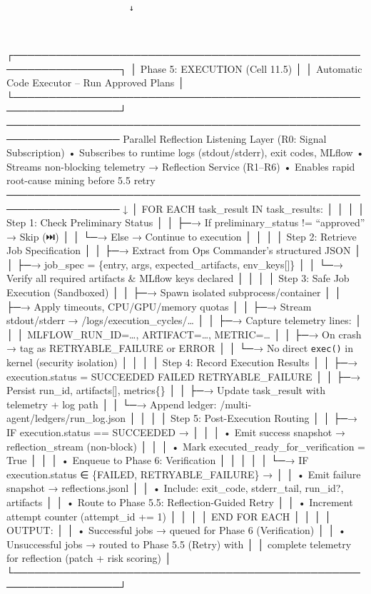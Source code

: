 \documentclass[
]{article}
\begin{document}
\begin{verbatim}
                        ↓
                        
                        
\end{verbatim}

┌─────────────────────────────────────────────────────────────────┐ │
Phase 5: EXECUTION (Cell 11.5) │ │ Automatic Code Executor -- Run
Approved Plans │
└─────────────────────────────────────────────────────────────────┘
──────────────────────────────────────────────────────────────────
Parallel Reflection Listening Layer (R0: Signal Subscription) •
Subscribes to runtime logs (stdout/stderr), exit codes, MLflow • Streams
non-blocking telemetry → Reflection Service (R1--R6) • Enables rapid
root-cause mining before 5.5 retry
────────────────────────────────────────────────────────────────── ↓ │
FOR EACH task\_result IN task\_results: │ │ │ │ Step 1: Check
Preliminary Status │ │ ├─→ If preliminary\_status != ``approved'' → Skip
(⏭️) │ │ └─→ Else → Continue to execution │ │ │ │ Step 2: Retrieve Job
Specification │ │ ├─→ Extract from Ops Commander's structured JSON │ │
├─→ job\_spec = \{entry, args, expected\_artifacts, env\_keys{[}{]}\} │
│ └─→ Verify all required artifacts \& MLflow keys declared │ │ │ │ Step
3: Safe Job Execution (Sandboxed) │ │ ├─→ Spawn isolated
subprocess/container │ │ ├─→ Apply timeouts, CPU/GPU/memory quotas │ │
├─→ Stream stdout/stderr → /logs/execution\_cycles/\ldots{} │ │ ├─→
Capture telemetry lines: │ │ │ MLFLOW\_RUN\_ID=\ldots, ARTIFACT=\ldots,
METRIC=\ldots{} │ │ ├─→ On crash → tag as RETRYABLE\_FAILURE or ERROR │
│ └─→ No direct \texttt{exec()} in kernel (security isolation) │ │ │ │
Step 4: Record Execution Results │ │ ├─→ execution.status = SUCCEEDED
\textbar{} FAILED \textbar{} RETRYABLE\_FAILURE │ │ ├─→ Persist run\_id,
artifacts{[}{]}, metrics\{\} │ │ ├─→ Update task\_result with telemetry
+ log path │ │ └─→ Append ledger: /multi-agent/ledgers/run\_log.json │ │
│ │ Step 5: Post-Execution Routing │ │ ├─→ IF execution.status ==
SUCCEEDED → │ │ │ • Emit success snapshot → reflection\_stream
(non-block) │ │ │ • Mark executed\_ready\_for\_verification = True │ │ │
• Enqueue to Phase 6: Verification │ │ │ │ │ └─→ IF execution.status ∈
\{FAILED, RETRYABLE\_FAILURE\} → │ │ • Emit failure snapshot →
reflections.jsonl │ │ • Include: exit\_code, stderr\_tail, run\_id?,
artifacts │ │ • Route to Phase 5.5: Reflection-Guided Retry │ │ •
Increment attempt counter (attempt\_id += 1) │ │ │ │ END FOR EACH │ │ │
│ OUTPUT: │ │ • Successful jobs → queued for Phase 6 (Verification) │ │
• Unsuccessful jobs → routed to Phase 5.5 (Retry) with │ │ complete
telemetry for reflection (patch + risk scoring) │
└─────────────────────────────────────────────────────────────────┘
\end{document}
